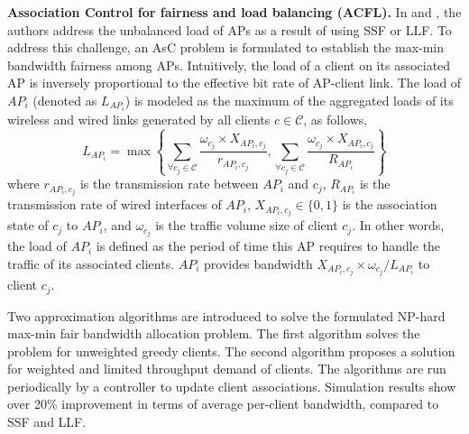 \textbf{Association Control for fairness and load balancing (ACFL).} 
In \cite{F-LB-AsscCtrl-2004} and \cite{F-LB-AsscCtrl-2007}, the authors address the unbalanced load of APs as a result of using SSF or LLF.
To address this challenge, an AsC problem is formulated to establish the max-min bandwidth fairness among APs. 
Intuitively, the load of a client on its associated AP is inversely proportional to the effective bit rate of AP-client link. 
The load of $AP_{i}$ (denoted as $L_{AP_{i}}$) is modeled as the maximum of the aggregated loads of its wireless and wired links generated by all clients $c\in \mathcal{C}$, as follows,
\begin{equation}
L_{AP_{i}}=\max\left\{ \sum_{\forall c_{j}\in \mathcal{C}} \frac{\omega_{c_{j}} \times X_{AP_i, c_j}}{r_{AP_i, c_j}},  \sum_{\forall c_{j}\in \mathcal{C}} \frac{\omega_{c_{j}} \times X_{AP_{i},c_j}}{R_{AP_{i}}} \right\}
\end{equation}
where $r_{AP_i, c_j}$ is the transmission rate between $AP_{i}$ and $c_{j}$, $R_{AP_{i}}$ is the transmission rate of wired interfaces of $AP_{i}$, $X_{AP_{i},c_{j}}\in\{0,1\}$ is the association state of $c_{j}$ to $AP_{i}$, and $\omega_{c_{j}}$ is the traffic volume size of client $c_{j}$. 
In other words, the load of $AP_{i}$ is defined as the period of time this AP requires to handle the traffic of its associated clients. 
$AP_{i}$ provides bandwidth $X_{AP_{i},c_{j}} \times \omega_{c_{j}}/L_{AP_{i}}$ to client $c_{j}$. 

Two approximation algorithms are introduced to solve the formulated NP-hard max-min fair bandwidth allocation problem. 
The first algorithm solves the problem for unweighted greedy clients. 
The second algorithm proposes a solution for weighted and limited throughput demand of clients.
The algorithms are run periodically by a controller to update client associations. 
Simulation results show over 20$\%$ improvement in terms of average per-client bandwidth, compared to SSF and LLF.


